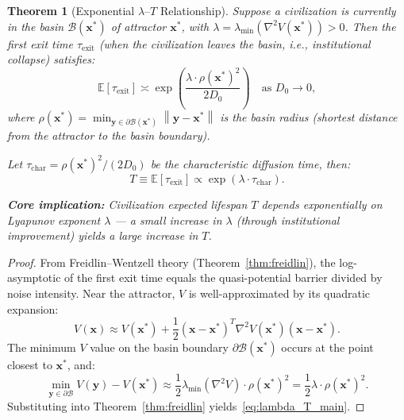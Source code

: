 \documentclass[12pt,a4paper]{article}
\newtheorem{theorem}{Theorem}[section]
\theoremstyle{definition}
\newcommand{\E}{\mathbb{E}}
\newcommand{\norm}[1]{\left\|#1\right\|}
\newcommand{\paren}[1]{\left(#1\right)}
\newcommand{\calB}{\mathcal{B}}
\newcommand{\lb}{\lambda}
\newcommand{\lambdamin}{\lambda_{\min}}
\newcommand{\Lyap}{V}
\begin{document}
\begin{theorem}[Exponential $\lb$--$T$ Relationship]
\label{thm:lambda_T}
Suppose a civilization is currently in the basin $\calB(\mathbf{x}^*)$ of attractor $\mathbf{x}^*$, with $\lb = \lambdamin(\nabla^2 \Lyap(\mathbf{x}^*)) > 0$. Then the first exit time $\tau_{\text{exit}}$ (when the civilization leaves the basin, i.e., institutional collapse) satisfies:
\begin{equation}\label{eq:lambda_T_main}
    \E[\tau_{\text{exit}}] \asymp \exp\paren{\frac{\lb \cdot \rho(\mathbf{x}^*)^2}{2 D_0}} \quad \text{as } D_0 \to 0,
\end{equation}
where $\rho(\mathbf{x}^*) = \min_{\mathbf{y} \in \partial \calB(\mathbf{x}^*)} \norm{\mathbf{y} - \mathbf{x}^*}$ is the basin radius (shortest distance from the attractor to the basin boundary).

Let $\tau_{\text{char}} = \rho(\mathbf{x}^*)^2 / (2D_0)$ be the characteristic diffusion time, then:
\begin{equation}\label{eq:lambda_T_simple}
    T \equiv \E[\tau_{\text{exit}}] \propto \exp\paren{\lb \cdot \tau_{\text{char}}}.
\end{equation}

\textbf{Core implication:} Civilization expected lifespan $T$ depends exponentially on Lyapunov exponent $\lb$ --- a small increase in $\lb$ (through institutional improvement) yields a large increase in $T$.
\end{theorem}

\begin{proof}
From Freidlin--Wentzell theory (Theorem~\ref{thm:freidlin}), the log-asymptotic of the first exit time equals the quasi-potential barrier divided by noise intensity. Near the attractor, $\Lyap$ is well-approximated by its quadratic expansion:
\begin{equation*}
    \Lyap(\mathbf{x}) \approx \Lyap(\mathbf{x}^*) + \frac{1}{2} (\mathbf{x} - \mathbf{x}^*)^T \nabla^2 \Lyap(\mathbf{x}^*) (\mathbf{x} - \mathbf{x}^*).
\end{equation*}
The minimum $\Lyap$ value on the basin boundary $\partial \calB(\mathbf{x}^*)$ occurs at the point closest to $\mathbf{x}^*$, and:
\begin{equation*}
    \min_{\mathbf{y} \in \partial \calB} \Lyap(\mathbf{y}) - \Lyap(\mathbf{x}^*) \approx \frac{1}{2} \lambdamin(\nabla^2 \Lyap) \cdot \rho(\mathbf{x}^*)^2 = \frac{1}{2} \lb \cdot \rho(\mathbf{x}^*)^2.
\end{equation*}
Substituting into Theorem~\ref{thm:freidlin} yields~\eqref{eq:lambda_T_main}.
\end{proof}
\end{document}
